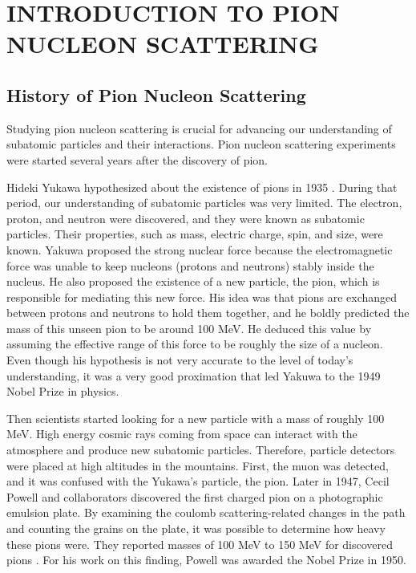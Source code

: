 \chapter{INTRODUCTION TO PION NUCLEON SCATTERING}



\section{History of Pion Nucleon Scattering}


Studying pion nucleon scattering is crucial for advancing our understanding of subatomic particles and their interactions. Pion nucleon scattering experiments were started several years after the discovery of pion.

Hideki Yukawa hypothesized about the existence of pions in 1935 \cite{Yukawa:1935xg}. During that period, our understanding of subatomic particles was very limited. The electron, proton, and neutron were discovered, and they were known as subatomic particles. Their properties, such as mass, electric charge, spin, and size, were known. Yakuwa proposed the strong nuclear force because the electromagnetic force was unable to keep nucleons (protons and neutrons) stably inside the nucleus. He also proposed the existence of a new particle, the pion, which is responsible for mediating this new force. His idea was that pions are exchanged between protons and neutrons to hold them together, and he boldly predicted the mass of this unseen pion to be around 100 MeV. He deduced this value by assuming the effective range of this force to be roughly the size of a nucleon. Even though his hypothesis is not very accurate to the level of today's understanding, it was a very good proximation that led Yakuwa to the 1949 Nobel Prize in physics.

Then scientists started looking for a new particle with a mass of roughly 100 MeV. High energy cosmic rays coming from space can interact with the atmosphere and produce new subatomic particles. Therefore, particle detectors were placed at high altitudes in the mountains. First, the muon was detected, and it was confused with the Yukawa's particle, the pion. Later in 1947, Cecil Powell and collaborators discovered the first charged pion \cite{Lattes1947ProcessesIC} on a photographic emulsion plate. By examining the coulomb scattering-related changes in the path and counting the grains on the plate, it was possible to determine how heavy these pions were. They reported masses of 100 MeV to 150 MeV for discovered pions \cite{CFPowell_1950}. For his work on this finding, Powell was awarded the Nobel Prize in 1950.

